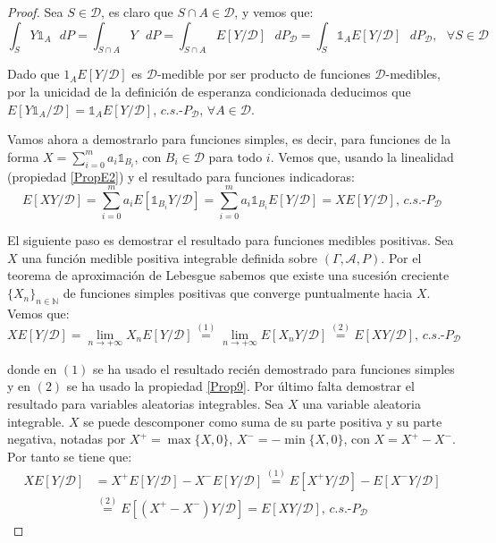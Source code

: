 \begin{proof}
Sea $S\in \mathcal{D}$, es claro que $S\cap A\in \mathcal{D}$, y vemos que:
$$\int_S Y\mathds{1}_A\text{ }dP  = \int_{S\cap A} Y\text{ }dP = \int_{S\cap A} E[Y/\mathcal{D}]\text{ }dP_{\mathcal{D}} = \int_{S} \mathds{1}_A E[Y/\mathcal{D}]\text{ }dP_{\mathcal{D}},\text{ }\forall S\in\mathcal{D}$$

Dado que ${1}_A E[Y/\mathcal{D}]$ es $\mathcal{D}$-medible por ser producto de funciones $\mathcal{D}$-medibles, por la unicidad de la definición de esperanza condicionada deducimos que $E[Y\mathds{1}_A/\mathcal{D}] = \mathds{1}_A E[Y/\mathcal{D}]$, $c.s.\text{-}P_{\mathcal{D}}$, $\forall A\in\mathcal{D}$.

Vamos ahora a demostrarlo para funciones simples, es decir, para funciones de la forma $X=\sum_{i=0}^m a_i\mathds{1}_{B_i}$, con $B_i\in \mathcal{D}$ para todo $i$. Vemos que, usando la linealidad (propiedad \ref{PropE2}) y el resultado para funciones indicadoras:
$$E[XY/\mathcal{D}] = \sum_{i=0}^m a_i E[\mathds{1}_{B_i}Y/\mathcal{D}] = \sum_{i=0}^m a_i \mathds{1}_{B_i} E[Y/\mathcal{D}] = X E[Y/\mathcal{D}]\text{, }c.s.\text{-}P_{\mathcal{D}}$$

El siguiente paso es demostrar el resultado para funciones medibles positivas. Sea $X$ una función medible positiva integrable definida sobre $(\Gamma, \mathcal{A}, P)$. Por el teorema de aproximación de Lebesgue sabemos que existe una sucesión creciente $\{X_n\}_{n\in\mathds{N}}$ de funciones simples positivas que converge puntualmente hacia $X$. Vemos que:
$$XE[Y/\mathcal{D}] = \lim_{n\to +\infty} X_n E[Y/\mathcal{D}] \overset{(1)}{=} \lim_{n\to +\infty} E[X_n Y/\mathcal{D}] \overset{(2)}{=} E[XY/\mathcal{D}] \text{, } c.s.\text{-}P_{\mathcal{D}}$$

donde en $(1)$ se ha usado el resultado recién demostrado para funciones simples y en $(2)$ se ha usado la propiedad \ref{Prop9}. Por último falta demostrar el resultado para variables aleatorias integrables. Sea $X$ una variable aleatoria integrable. $X$ se puede descomponer como suma de su parte positiva y su parte negativa, notadas por $X^+=\max\{X, 0\}$, $X^-=-\min\{X, 0\}$, con $X = X^+ - X^-$. Por tanto se tiene que:
\begin{align*}
XE[Y/\mathcal{D}] &= X^+ E[Y/\mathcal{D}] - X^- E[Y/\mathcal{D}] \overset{(1)}{=} E[X^+ Y/\mathcal{D}] - E[X^- Y/\mathcal{D}]\\
&\overset{(2)}{=} E[(X^+-X^-)Y/\mathcal{D}] = E[XY/\mathcal{D}] \text{, } c.s.\text{-}P_{\mathcal{D}}
\end{align*}


\end{proof}
